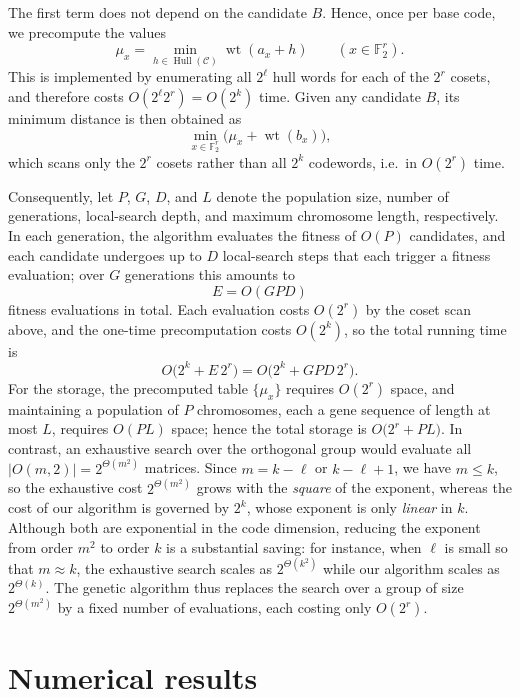 \documentclass{article}
\newcommand{\Hull}{\operatorname{Hull}}
\begin{document}
The first term does not depend on the candidate $B$. Hence, once per base code, we precompute the values
\[
\mu_x=\min_{h\in\Hull(\mathcal{C})}\operatorname{wt}(a_x+h)
\qquad (x\in\mathbb{F}_2^r).
\]
This is implemented by enumerating all $2^{\ell}$ hull words for each of the $2^{r}$ cosets, and therefore costs $O(2^{\ell}2^{r})=O(2^{k})$ time. Given any candidate $B$, its minimum distance is then obtained as
\[
\min_{x\in\mathbb{F}_2^r}\big(\mu_x+\operatorname{wt}(b_x)\big),
\]
which scans only the $2^{r}$ cosets rather than all $2^{k}$ codewords, i.e.\ in $O(2^{r})$ time.

Consequently, let $P$, $G$, $D$, and $L$ denote the population size, number of generations, local-search depth, and maximum chromosome length, respectively. In each generation, the algorithm evaluates the fitness of $O(P)$ candidates, and each candidate undergoes up to $D$ local-search steps that each trigger a fitness evaluation; over $G$ generations this amounts to
\[
E=O(GPD)
\]
fitness evaluations in total. Each evaluation costs $O(2^{r})$ by the coset scan above, and the one-time precomputation costs $O(2^{k})$, so the total running time is
\[
O\!\big(2^{k}+E\,2^{r}\big)=O\!\big(2^{k}+GPD\,2^{r}\big).
\]
For the storage, the precomputed table $\{\mu_x\}$ requires $O(2^{r})$ space, and maintaining a population of $P$ chromosomes, each a gene sequence of length at most $L$, requires $O(PL)$ space; hence the total storage is $O\!\big(2^{r}+PL\big)$. In contrast, an exhaustive search over the orthogonal group would evaluate all $|O(m,2)|=2^{\Theta(m^{2})}$ matrices. Since $m=k-\ell$ or $k-\ell+1$, we have $m\le k$, so the exhaustive cost $2^{\Theta(m^{2})}$ grows with the \emph{square} of the exponent, whereas the cost of our algorithm is governed by $2^{k}$, whose exponent is only \emph{linear} in $k$. Although both are exponential in the code dimension, reducing the exponent from order $m^{2}$ to order $k$ is a substantial saving: for instance, when $\ell$ is small so that $m\approx k$, the exhaustive search scales as $2^{\Theta(k^{2})}$ while our algorithm scales as $2^{\Theta(k)}$. The genetic algorithm thus replaces the search over a group of size $2^{\Theta{(m^2)}}$ by a fixed number of evaluations, each costing only $O(2^{r})$.
\section{Numerical results}
\end{document}
